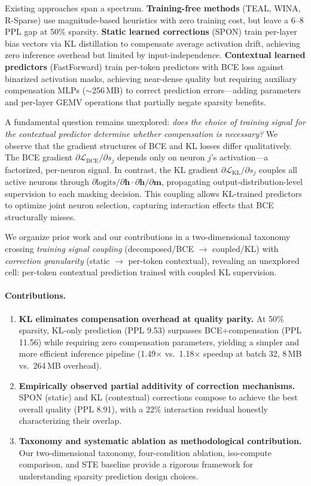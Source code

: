 \documentclass[11pt]{article}
\begin{document}
Existing approaches span a spectrum. \textbf{Training-free methods} (TEAL, WINA, R-Sparse) use magnitude-based heuristics with zero training cost, but leave a 6--8 PPL gap at 50\% sparsity. \textbf{Static learned corrections} (SPON) train per-layer bias vectors via KL distillation to compensate average activation drift, achieving zero inference overhead but limited by input-independence. \textbf{Contextual learned predictors} (FastForward) train per-token predictors with BCE loss against binarized activation masks, achieving near-dense quality but requiring auxiliary compensation MLPs (${\sim}$256\,MB) to correct prediction errors---adding parameters and per-layer GEMV operations that partially negate sparsity benefits.

A fundamental question remains unexplored: \emph{does the choice of training signal for the contextual predictor determine whether compensation is necessary?} We observe that the gradient structures of BCE and KL losses differ qualitatively. The BCE gradient $\partial \mathcal{L}_{\text{BCE}}/\partial s_j$ depends only on neuron $j$'s activation---a factorized, per-neuron signal. In contrast, the KL gradient $\partial \mathcal{L}_{\text{KL}}/\partial s_j$ couples all active neurons through $\partial \text{logits}/\partial \mathbf{h} \cdot \partial \mathbf{h}/\partial \mathbf{m}$, propagating output-distribution-level supervision to each masking decision. This coupling allows KL-trained predictors to optimize joint neuron selection, capturing interaction effects that BCE structurally misses.

We organize prior work and our contributions in a two-dimensional taxonomy crossing \emph{training signal coupling} (decomposed/BCE $\rightarrow$ coupled/KL) with \emph{correction granularity} (static $\rightarrow$ per-token contextual), revealing an unexplored cell: per-token contextual prediction trained with coupled KL supervision.

\paragraph{Contributions.}
\begin{enumerate}
\item \textbf{KL eliminates compensation overhead at quality parity.} At 50\% sparsity, KL-only prediction (PPL 9.53) surpasses BCE+compensation (PPL 11.56) while requiring zero compensation parameters, yielding a simpler and more efficient inference pipeline (1.49$\times$ vs.\ 1.18$\times$ speedup at batch 32, 8\,MB vs.\ 264\,MB overhead).
\item \textbf{Empirically observed partial additivity of correction mechanisms.} SPON (static) and KL (contextual) corrections compose to achieve the best overall quality (PPL 8.91), with a 22\% interaction residual honestly characterizing their overlap.
\item \textbf{Taxonomy and systematic ablation as methodological contribution.} Our two-dimensional taxonomy, four-condition ablation, iso-compute comparison, and STE baseline provide a rigorous framework for understanding sparsity prediction design choices.
\end{enumerate}
\end{document}
